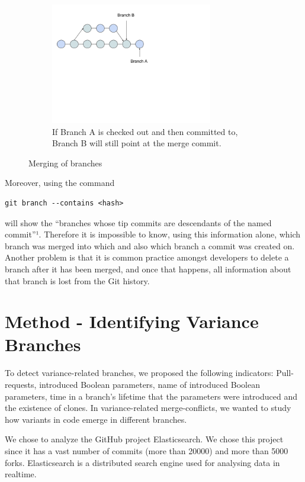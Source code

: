 \begin{figure}
\begin{subfigure}[b]{0.3\textwidth}
   \includegraphics[width=200pt]{figure/branch3.png}
   \caption{If Branch A is checked out and then committed to, Branch B will still point at the merge commit.}
   \label{fig:mbranch3}
\end{subfigure}
\caption{Merging of branches}\label{fig:branches}
\end{figure}

Moreover, using the command
\lstset{language=Bash,numbers=left,xleftmargin=2em,frame=single,framexleftmargin=1.5em}
\begin{lstlisting}[frame=single,breaklines=true,tabsize=2]
git branch --contains <hash>
\end{lstlisting}
will show the “branches whose tip commits are descendants of the named commit”¹. Therefore it is impossible to know, using this information alone, which branch was merged into which and also which branch a commit was created on. Another problem is that it is common practice amongst developers to delete a branch after it has been merged, and once that happens, all information about that branch is lost from the Git history.

\section{Method - Identifying Variance Branches}
To detect variance-related branches, we proposed the following indicators: Pull-requests, introduced Boolean parameters, name of introduced Boolean parameters, time in a branch’s lifetime that the parameters were introduced and the existence of clones. In variance-related merge-conflicts, we wanted to study how variants in code emerge in different branches.

We chose to analyze the GitHub project Elasticsearch. We chose this project since it has a vast number of commits (more than 20000) and more than 5000 forks. Elasticsearch is a distributed search engine used for analysing data in realtime.  %

